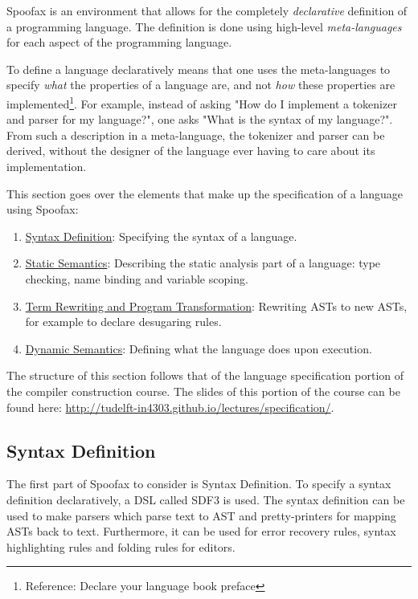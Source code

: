 Spoofax is an environment that allows for the completely \emph{declarative}
definition of a programming language. The definition is done using
high-level \emph{meta-languages} for each aspect of the programming
language.

To define a language declaratively means that one uses the
meta-languages to specify \emph{what} the properties of a language are, and
not \emph{how} these properties are
implemented\footnote{Reference: Declare your language book
preface}. For example, instead of asking "How do I implement a
tokenizer and parser for my language?", one asks "What is the syntax
of my language?". From such a description in a meta-language, the
tokenizer and parser can be derived, without the designer of the
language ever having to care about its implementation.

This section goes over the elements that make up the specification of
a language using Spoofax:
\begin{enumerate}
\item \hyperref[sec-syntax-def]{Syntax Definition}: Specifying the syntax of a language.
\item \hyperref[sec-static-analysis]{Static Semantics}: Describing the static analysis part of a
language: type checking, name binding and variable scoping.
\item \hyperref[sec-term-rewrite]{Term Rewriting and Program Transformation}: Rewriting ASTs to new
ASTs, for example to declare desugaring rules.
\item \hyperref[sec-dynamic-semantics]{Dynamic Semantics}: Defining what the language does upon execution.
\end{enumerate}

The structure of this section follows that of the language
specification portion of the compiler construction course. The slides
of this portion of the course can be found here:
\url{http://tudelft-in4303.github.io/lectures/specification/}.
\subsection{Syntax Definition}
\label{sec-syntax-def}
The first part of Spoofax to consider is Syntax Definition. To specify
a syntax definition declaratively, a DSL called SDF3 is used. The
syntax definition can be used to make parsers which parse text to AST
and pretty-printers for mapping ASTs back to text. Furthermore, it can
be used for error recovery rules, syntax highlighting rules and
folding rules for editors.


